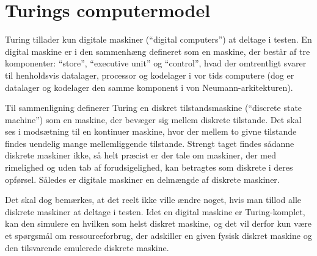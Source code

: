 \documentclass{article}
\author{Mikkel K. Mathiesen, Jannik Gram, Rune \& Rasmus Abrahams{\tt (son|en)}}
\title{}
\date{\today}
\begin{document}
\maketitle
\section{Turings computermodel}



Turing tillader kun digitale maskiner (``digital computers'') at deltage i testen. En digital maskine er i den sammenhæng defineret som en maskine, der består af tre komponenter: ``store'', ``executive unit'' og ``control'', hvad der omtrentligt svarer til henholdsvis datalager, processor og kodelager i vor tids computere (dog er datalager og kodelager den samme komponent i von Neumann-arkitekturen).

Til sammenligning definerer Turing en diskret tilstandsmaskine (``discrete state machine'') som en maskine, der bevæger sig mellem diskrete tilstande. Det skal ses i modsætning til en kontinuer maskine, hvor der mellem to givne tilstande findes uendelig mange mellemliggende tilstande. Strengt taget findes sådanne diskrete maskiner ikke, så helt præcist er der tale om maskiner, der med rimelighed og uden tab af forudsigelighed, kan betragtes som diskrete i deres opførsel. Således er digitale maskiner en delmængde af diskrete maskiner.

Det skal dog bemærkes, at det reelt ikke ville ændre noget, hvis man tillod alle diskrete maskiner at deltage i testen. Idet en digital maskine er Turing-komplet, kan den simulere en hvilken som helst diskret maskine, og det vil derfor kun være et spørgsmål om ressourceforbrug, der adskiller en given fysisk diskret maskine og den tilsvarende emulerede diskrete maskine. 
\end{document}
